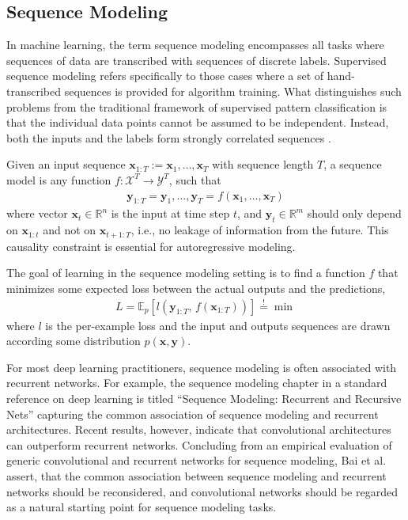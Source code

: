 \documentclass{scrartcl}
\begin{document}
\subsection{Sequence Modeling}
In machine learning, the term sequence modeling encompasses all tasks where sequences of data are transcribed with sequences of discrete labels. Supervised sequence modeling refers specifically to those cases where a set of hand-transcribed sequences is provided for algorithm training. What distinguishes such problems from the traditional framework of supervised pattern classification is that the individual data points cannot be assumed to be independent. Instead, both the inputs and the labels form strongly correlated sequences \cite{Graves2012}.

Given an input sequence $\mathbf x_{1:T} := \mathbf x_1, \dots, \mathbf x_T$ with sequence length $T$, a sequence model is any function $f: \mathcal X^T \rightarrow \mathcal Y^T$, such that
\begin{align}
\mathbf y_{1:T} = \mathbf y_1, \dots, \mathbf y_T = f(\mathbf x_1,\dots, \mathbf x_T)
\end{align}
where vector $\mathbf x_t \in \mathbb R^n$ is the input at time step $t$, and $\mathbf y_t \in \mathbb R^m$ should only depend on $\mathbf x_{1:t}$ and not on $\mathbf x_{t+1:T}$, i.e., no leakage of information from the future. This causality constraint is essential for autoregressive modeling. 


The goal of learning in the sequence modeling setting is to find a function $f$ that minimizes some expected loss between the actual outputs and the predictions, 
\begin{align}
L = \mathbb E_p\left[l(\mathbf y_{1:T}, \, f(\mathbf x_{1:T}) )\right] \stackrel{\text{!}}{=} \min
\end{align}
where $l$ is the per-example loss and the input and outputs sequences are drawn according some distribution $p(\mathbf x,\mathbf y)$.

For most deep learning practitioners, sequence modeling is often associated with recurrent networks. For example, the sequence modeling chapter in a standard reference on deep learning is titled ``Sequence Modeling: Recurrent and Recursive Nets'' \cite{Goodfellow2016} capturing the common association of sequence modeling and recurrent architectures. Recent results, however, indicate that convolutional architectures can outperform recurrent networks. Concluding from an empirical evaluation of generic convolutional and recurrent networks for sequence modeling, Bai et al. \cite{Bai2018} assert, that the common association between sequence modeling and recurrent networks should be reconsidered, and convolutional networks should be regarded as a natural starting point for sequence modeling tasks.
\end{document}
